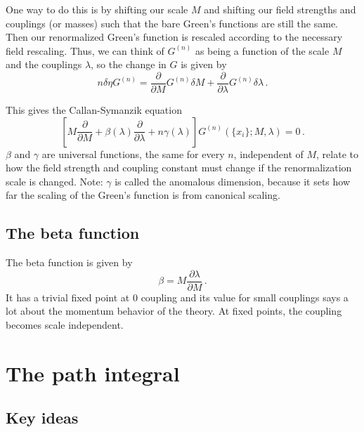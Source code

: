 \documentclass[12pt]{memoir}
\begin{document}
One way to do this is by shifting our scale $M$ and shifting our field strengths and couplings (or masses)
such that the bare Green's functions are still the same.
Then our renormalized Green's function is rescaled according to the necessary field rescaling.
Thus, we can think of $G^{(n)}$ as being a function of the scale $M$ and the couplings $\lambda$,
so the change in $G$ is given by
\begin{equation}
  n \delta \eta G^{(n)} = \frac{\partial}{\partial M}G^{(n)} \delta M + \frac{\partial}{\partial \lambda} G^{(n)} \delta \lambda \,.
\end{equation}

This gives the Callan-Symanzik equation
\begin{equation}
  \left[M \frac{\partial}{\partial M} + \beta(\lambda) \frac{\partial}{\partial \lambda} + n \gamma(\lambda)\right]G^{(n)}(\{x_i\}; M, \lambda) = 0\,.
\end{equation}
$\beta$ and $\gamma$ are universal functions, the same for every $n$, independent of $M$,
relate to how the field strength and coupling constant must change if the renormalization scale is changed.
Note: $\gamma$ is called the anomalous dimension, because it sets how far the scaling of the Green's function is
from canonical scaling.

\section{The beta function}

The beta function is given by
\begin{equation}
  \beta = M \frac{\partial \lambda}{\partial M}\,.
\end{equation}
It has a trivial fixed point at 0 coupling and its value for small couplings says a lot about the momentum behavior of the theory.
At fixed points, the coupling becomes scale independent.

\chapter{The path integral}

\section{Key ideas}
\end{document}
